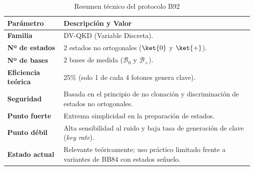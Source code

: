\begin{table}[h!]
\centering
\caption{Resumen técnico del protocolo B92}
\begin{tabular}{lp{8cm}}
\hline
\textbf{Parámetro} & \textbf{Descripción y Valor} \\
\hline
\textbf{Familia} & DV-QKD (Variable Discreta). \\
\textbf{Nº de estados} & 2 estados no ortogonales ($\ket{0}$ y $\ket{+}$). \\
\textbf{Nº de bases} & 2 bases de medida ($\mathcal{B}_0$ y $\mathcal{B}_+$). \\
\textbf{Eficiencia teórica} & 25\% (solo 1 de cada 4 fotones genera clave). \\
\textbf{Seguridad} & Basada en el principio de no clonación y discriminación de estados no ortogonales. \\
\textbf{Punto fuerte} & Extrema simplicidad en la preparación de estados. \\
\textbf{Punto débil} & Alta sensibilidad al ruido y baja tasa de generación de clave (\textit{key rate}). \\
\textbf{Estado actual} & Relevante teóricamente; uso práctico limitado frente a variantes de BB84 con estados señuelo. \\
\hline
\end{tabular}
\end{table}
